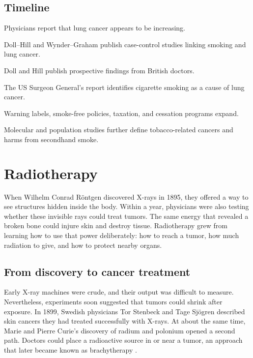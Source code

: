 \documentclass[12pt,oneside]{book}
\begin{document}
\section*{Timeline}
\begin{description}[leftmargin=2.3cm,style=nextline]
  \item[1930s--1940s] Physicians report that lung cancer appears to be increasing.
  \item[1950] Doll--Hill and Wynder--Graham publish case-control studies linking smoking and lung cancer.
  \item[1954] Doll and Hill publish prospective findings from British doctors.
  \item[1964] The US Surgeon General's report identifies cigarette smoking as a cause of lung cancer.
  \item[1970s--1990s] Warning labels, smoke-free policies, taxation, and cessation programs expand.
  \item[Twenty-first century] Molecular and population studies further define tobacco-related cancers and harms from secondhand smoke.
\end{description}

\chapter[Radiotherapy]{Radiotherapy}

When Wilhelm Conrad Röntgen discovered X-rays in 1895, they offered a way
to see structures hidden inside the body. Within a year, physicians were
also testing whether these invisible rays could treat tumors. The same
energy that revealed a broken bone could injure skin and destroy tissue.
Radiotherapy grew from learning how to use that power deliberately: how to
reach a tumor, how much radiation to give, and how to protect nearby organs.

\section{From discovery to cancer treatment}
Early X-ray machines were crude, and their output was difficult to measure.
Nevertheless, experiments soon suggested that tumors could shrink after
exposure. In 1899, Swedish physicians Tor Stenbeck and Tage Sjögren described
skin cancers they had treated successfully with X-rays. At about the same
time, Marie and Pierre Curie's discovery of radium and polonium opened a
second path. Doctors could place a radioactive source in or near a tumor,
an approach that later became known as brachytherapy
\cite{nciCancerMilestones,connellRadiotherapyHistory}.
\end{document}
